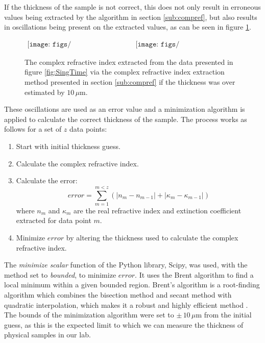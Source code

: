 If the thickness of the sample is not correct, this does not only result in erroneous values being extracted by the algorithm in section \ref{sub:compref}, but also results in oscillations being present on the extracted values, as can be seen in figure \ref{fig:SingExt_thErr}.

\begin{figure}[H]
                \begin{center}$
								\begin{array}{cc}
                \texttt{[image: figs/Single10umError\_n.png]}&
                \texttt{[image: figs/Single10umError\_k.png]}
								\end{array}$
								\end{center}
	\caption[Extracted complex refractive index for single layer isotropic with $10\,\mu$m error]{The complex refractive index extracted from the data presented in figure \ref{fig:SingTime} via the complex refractive index extraction method presented in section \ref{sub:compref} if the thickness was over estimated by $10\,\mu$m.}
	\label{fig:SingExt_thErr}
\end{figure}

These oscillations are used as an error value and a minimization algorithm is applied to calculate the correct thickness of the sample. The process works as follows for a set of $z$ data points:

\begin{enumerate}
	\item Start with initial thickness guess.
	\item Calculate the complex refractive index.
	\item Calculate the error:
	\begin{equation}
	error = \sum_{m=1}^{m<z}(|n_{m}-n_{m-1}| + |\kappa_{m}-\kappa_{m-1}|)
	\label{eq:ThickFit}
	\end{equation}
	where $n_{m}$ and $\kappa_{m}$ are the real refractive index and extinction coefficient extracted for data point $m$.
	\item Minimize $error$ by altering the thickness used to calculate the complex refractive index.
\end{enumerate}

The \textit{minimize scalar} function of the Python library, Scipy, was used, with the method set to \textit{bounded}, to minimize $error$. It uses the Brent algorithm to find a local minimum within a given bounded region. Brent's algorithm is a root-finding algorithm which combines the bisection method and secant method with quadratic interpolation, which makes it a robust and highly efficient method \cite{Zhang2011}.
The bounds of the minimization algorithm were set to $\pm\,10\,\mu$m from the initial guess, as this is the expected limit to which we can measure the thickness of physical samples in our lab.

